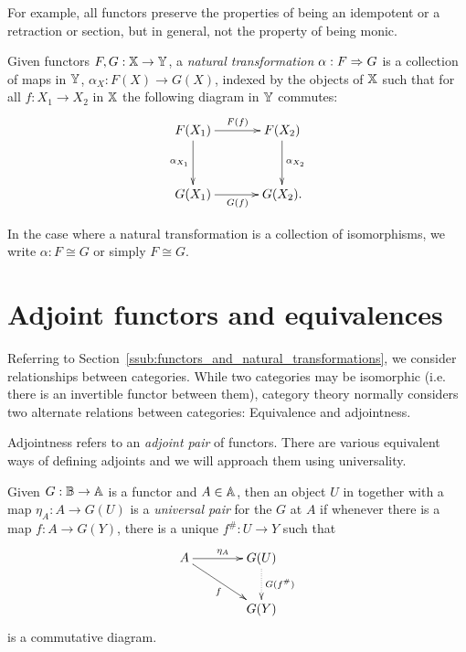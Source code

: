 For example, all functors preserve the properties of being an idempotent or a retraction or section,
but in general, not the property of being monic.

\begin{definition}\label{def:natural_transformation}
  Given functors $F,G:\mathbb{X} \to \mathbb{Y}$, a \emph{natural transformation} $\alpha:F \Rightarrow G$ is a collection
  of maps in $\mathbb{Y}$, $\alpha_X : F(X) \to G(X)$, indexed by the objects of $\mathbb{X}$ such that for all
  $f:X_1 \to X_2$ in $\mathbb{X}$ the following diagram in $\mathbb{Y}$ commutes:
  \[\xymatrix @R+10pt @C+10pt{
      F(X_1) \ar[r]^{F(f)} \ar[d]_{\alpha_{X_1}} & F(X_2) \ar[d]^{\alpha_{X_2}}\\
      G(X_1) \ar[r]_{G(f)} &  G(X_2).
    }
  \]
\end{definition}

In the case where a natural transformation is a collection of isomorphisms, we write $\alpha: F
\cong G$ or simply $F\cong G$.



\section{Adjoint functors and equivalences}
\label{sec:adjoint-functors-and-equivalences}

Referring to Section~\ref{ssub:functors_and_natural_transformations}, we consider relationships
between categories. While two categories may be isomorphic (i.e. there is an invertible functor
between them), category theory normally considers two alternate relations between categories:
Equivalence and adjointness.

Adjointness refers to an \emph{adjoint pair} of functors. There are various equivalent ways of
defining adjoints and we will approach them using universality.

\begin{definition}\label{def:universal_pair}
  Given $G:\mathbb{B}\to\mathbb{A}$ is a functor and $A\in \mathbb{A}$, then an object $U$ in \B together with a map
  $\eta_A:A\to G(U)$ is a \emph{universal pair} for the $G$ at $A$ if whenever there is a map
  $f:A\to G(Y)$, there is a unique $f^{\#}:U\to Y$ such that
  \[
    \xymatrix@C+15pt{
      A \ar[r]^{\eta_A} \ar[dr]_{f} & G(U) \ar@{.>}[d]^{G(f^{\#})}\\
      & G(Y)
    }
  \]
  is a commutative diagram.
\end{definition}

